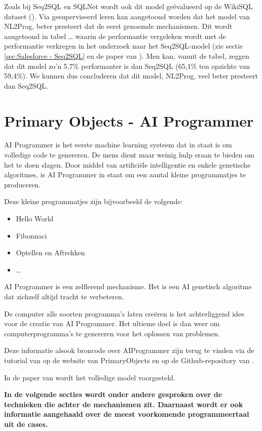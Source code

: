 Zoals bij Seq2SQL en SQLNet wordt ook dit model geëvalueerd op de WikiSQL dataset (\textcite{wikisql}). Via gesuperviseerd leren kan aangetoond worden dat het model van NL2Prog, beter presteert dat de eerst genoemde mechanismen. Dit wordt aangetoond in tabel … waarin de performantie vergeleken wordt met de performantie verkregen in het onderzoek naar het Seq2SQL-model (zie sectie  \ref{sec:Salesforce - Seq2SQL} en de paper van \textcite{seq2sqlPaper}). Men kan, vanuit de tabel, zeggen dat dit model zo’n 5,7\% performanter is dan Seq2SQL (65,1\% ten opzichte van 59,4\%). We kunnen dus concluderen dat dit model, NL2Prog, veel beter presteert dan Seq2SQL.

\section{Primary Objects - AI Programmer}

AI Programmer is het eerste machine learning systeem dat in staat is om volledige code te genereren. De mens dient maar weinig hulp eraan te bieden om het te doen slagen. Door middel van artificiële intelligentie en enkele genetische algoritmes, is AI Programmer in staat om een aantal kleine programmatjes te produceren. 

Deze kleine programmatjes zijn bijvoorbeeld de volgende:
\begin{itemize}
	\item Hello World
	\item Fibonnaci
	\item Optellen en Aftrekken
	\item \dots
\end{itemize}

AI Programmer is een zelflerend mechanisme. Het is een AI genetisch algoritme dat zichzelf altijd tracht te verbeteren.

De computer alle soorten programma’s laten creëren is het achterliggend idee voor de creatie van AI Programmer. Het ultieme doel is dan weer om computerprogramma’s te genereren voor het oplossen van problemen.

Deze informatie alsook broncode over AIProgrammer zijn terug te vinden via de tutorial van \textcite{primaryObject} op de website van PrimaryObjects en op de Github-repository van \textcite{github}.

In de paper van \textcite{aiProgrammer} wordt het volledige model voorgesteld.

\textbf{In de volgende secties wordt onder andere gesproken over de technieken die achter de mechanismen zit. Daarnaast wordt er ook informatie aangehaald over de meest voorkomende programmeertaal uit de cases.}
